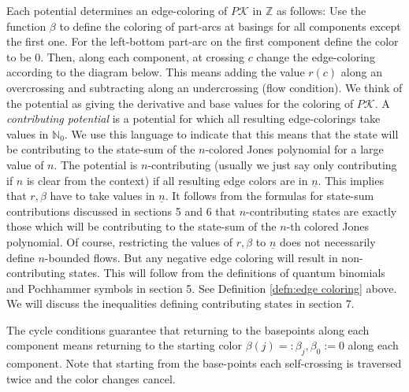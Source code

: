 \documentclass[11pt]{article}
\theoremstyle{definition}
\theoremstyle{remark}
\theoremstyle{remark}
\begin{document}
Each potential determines an edge-coloring of $P\mathcal{K}$ in $\mathbb{Z}$ as follows: Use the function $\beta$ to define the coloring of part-arcs at basings for all components except the first one. For the left-bottom part-arc on the first component define the color to be $0$. Then, along each component, at crossing $c$ change the edge-coloring according to the diagram below. This means adding the value $r(c)$ along an overcrossing and subtracting along an undercrossing (flow condition). We think of the potential as giving the derivative and base values for the coloring of $P\mathcal{K}$. 
A \textit{contributing potential} is a potential for which all resulting edge-colorings take values in $\mathbb{N}_0$. 
We use this language to indicate that this means that the state will be contributing to the state-sum of the $n$-colored Jones polynomial for a large value of $n$.
The potential is $n$-contributing (usually we just say only contributing if $n$ is clear from the context) if 
all resulting edge colors are in $\underline{n}$. This implies that $r,\beta $ have to take values in $\underline{n}$.
It follows from the formulas for state-sum contributions discussed in sections 5 and 6
that $n$-contributing states are exactly those which will be contributing to the state-sum of the $n$-th colored Jones polynomial.  
Of course, restricting the values of $r,\beta $ to $\underline{n}$ does not necessarily define $n$-bounded flows. But any negative edge coloring will result in non-contributing states. This will follow from the definitions of quantum binomials and Pochhammer symbols in section 5. See Definition \ref{defn:edge coloring} above. We will discuss the inequalities defining contributing states in section 7.
 
The cycle conditions guarantee that returning to the basepoints along each component means returning to the starting color $\beta (j)=:\beta_j, \beta_0:=0$ along each component. Note that starting from the base-points each self-crossing is traversed twice and the color changes cancel. 
\end{document}

